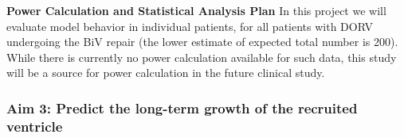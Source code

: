 



\textbf{Power Calculation and Statistical Analysis Plan}
In this project we will evaluate model behavior in individual patients, for all patients with DORV undergoing the BiV repair (the lower estimate of expected total number is 200). While there is currently no power calculation available for such data, this study will be a source for power calculation in the future clinical study. 




\subsubsection{Aim 3: Predict the long-term growth of the recruited ventricle}

